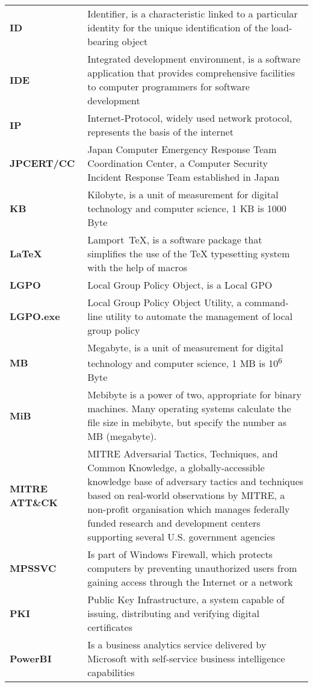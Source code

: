 \begin{longtable}{ p{4cm}  p{12cm} }
    \textbf{ID} & Identifier, is a characteristic linked to a particular identity for the unique identification of the load-bearing object\\
    \textbf{IDE} & Integrated development environment, is a software application that provides comprehensive facilities to computer programmers for software development\\
    \textbf{IP} & Internet-Protocol, widely used network protocol, represents the basis of the internet\\
    \textbf{JPCERT/CC} & Japan Computer Emergency Response Team Coordination Center, a Computer Security Incident Response Team established in Japan\\
    \textbf{KB} & Kilobyte,  is a unit of measurement for digital technology and computer science, 1 KB is 1000 Byte\\
    \textbf{LaTeX} & Lamport TeX, is a software package that simplifies the use of the TeX typesetting system with the help of macros\\
    \textbf{LGPO} & Local Group Policy Object, is a Local GPO\\
    \textbf{LGPO.exe} & Local Group Policy Object Utility, a command-line utility to automate the management of local group policy\\
    \textbf{MB} & Megabyte,  is a unit of measurement for digital technology and computer science, 1 MB is 10\textsuperscript{6} Byte\\
    \textbf{MiB} & Mebibyte is a power of two, appropriate for binary machines. Many operating systems calculate the file size in mebibyte, but specify the number as MB (megabyte). \\
    \textbf{MITRE ATT\&CK} & MITRE Adversarial Tactics, Techniques, and Common Knowledge, a globally-accessible knowledge base of adversary tactics and techniques based on real-world observations by MITRE, a non-profit organisation which manages federally funded research and development centers supporting several U.S. government agencies\\
    \textbf{MPSSVC} & Is part of Windows Firewall, which protects computers by preventing unauthorized users from gaining access through the Internet or a network\\
    \textbf{PKI} & Public Key Infrastructure,  a system capable of issuing, distributing and verifying digital certificates\\
    \textbf{PowerBI} & Is a business analytics service delivered by Microsoft with self-service business intelligence capabilities\\

\end{longtable}
